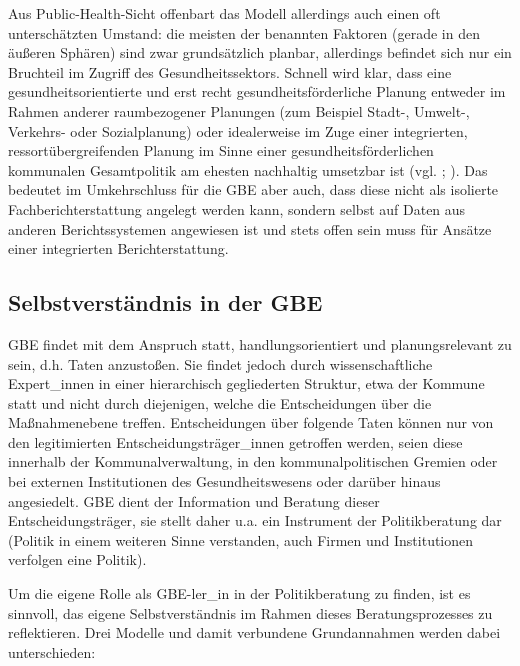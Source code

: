 \documentclass{article}
\begin{document}
Aus Public-Health-Sicht offenbart das Modell allerdings auch einen oft unterschätzten Umstand: die meisten der benannten Faktoren (gerade in den äußeren Sphären) sind zwar grundsätzlich planbar, allerdings befindet sich nur ein Bruchteil im Zugriff des Gesundheitssektors. Schnell wird klar, dass eine gesundheitsorientierte und erst recht gesundheitsförderliche Planung entweder im Rahmen anderer raumbezogener Planungen (zum Beispiel Stadt-, Umwelt-, Verkehrs- oder Sozialplanung) oder idealerweise im Zuge einer integrierten, ressortübergreifenden Planung im Sinne einer gesundheitsförderlichen kommunalen Gesamtpolitik am ehesten nachhaltig umsetzbar ist (vgl. \autocite{LandeszentrumGesundheitNordrhein-Westfalen(LZG.NRW)2019}; \autocite{ClaßenThomas2020}). Das bedeutet im Umkehrschluss für die GBE aber auch, dass diese nicht als isolierte Fachberichterstattung angelegt werden kann, sondern selbst auf Daten aus anderen Berichtssystemen angewiesen ist und stets offen sein muss für Ansätze einer integrierten Berichterstattung. 


\subsection{Selbstverständnis in der GBE}\label{H4406084}



GBE findet mit dem Anspruch statt, handlungsorientiert und planungsrelevant zu sein, d.h. Taten anzustoßen. Sie findet jedoch durch wissenschaftliche Expert\_innen in einer hierarchisch gegliederten Struktur, etwa der Kommune statt und nicht durch diejenigen, welche die Entscheidungen über die Maßnahmenebene treffen. Entscheidungen über folgende Taten können nur von den legitimierten Entscheidungsträger\_innen getroffen werden, seien diese innerhalb der Kommunalverwaltung, in den kommunalpolitischen Gremien oder bei externen Institutionen des Gesundheitswesens oder darüber hinaus angesiedelt. GBE dient der Information und Beratung dieser Entscheidungsträger, sie stellt daher u.a. ein Instrument der Politikberatung dar (Politik in einem weiteren Sinne verstanden, auch Firmen und Institutionen verfolgen eine Politik)\autocite{Brandundweitere2007}.


Um die eigene Rolle als GBE-ler\_in in der Politikberatung zu finden, ist es sinnvoll, das eigene Selbstverständnis im Rahmen dieses Beratungsprozesses zu reflektieren. Drei Modelle und damit verbundene Grundannahmen werden dabei unterschieden\autocite{Brandundweitere2007}:
\end{document}
